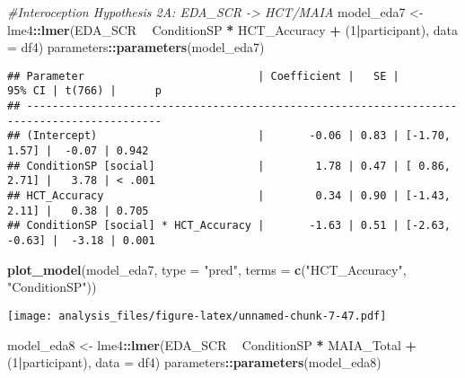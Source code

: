 \documentclass[
]{article}
\newenvironment{Shaded}{\begin{snugshade}}{\end{snugshade}}
\newcommand{\CommentTok}[1]{\textcolor[rgb]{0.56,0.35,0.01}{\textit{#1}}}
\newcommand{\DataTypeTok}[1]{\textcolor[rgb]{0.13,0.29,0.53}{#1}}
\newcommand{\DecValTok}[1]{\textcolor[rgb]{0.00,0.00,0.81}{#1}}
\newcommand{\KeywordTok}[1]{\textcolor[rgb]{0.13,0.29,0.53}{\textbf{#1}}}
\newcommand{\NormalTok}[1]{#1}
\newcommand{\OperatorTok}[1]{\textcolor[rgb]{0.81,0.36,0.00}{\textbf{#1}}}
\newcommand{\StringTok}[1]{\textcolor[rgb]{0.31,0.60,0.02}{#1}}
\begin{document}
\begin{Shaded}
\begin{Highlighting}[]
\CommentTok{#Interoception Hypothesis 2A: EDA_SCR -> HCT/MAIA}
\NormalTok{model_eda7 <-}\StringTok{ }\NormalTok{lme4}\OperatorTok{::}\KeywordTok{lmer}\NormalTok{(EDA_SCR }\OperatorTok{~}\StringTok{ }\NormalTok{ConditionSP }\OperatorTok{*}\StringTok{ }\NormalTok{HCT_Accuracy }\OperatorTok{+}\StringTok{ }\NormalTok{(}\DecValTok{1}\OperatorTok{|}\NormalTok{participant), }\DataTypeTok{data =}\NormalTok{ df4)}
\NormalTok{parameters}\OperatorTok{::}\KeywordTok{parameters}\NormalTok{(model_eda7)}
\end{Highlighting}
\end{Shaded}

\begin{verbatim}
## Parameter                           | Coefficient |   SE |         95% CI | t(766) |      p
## -------------------------------------------------------------------------------------------
## (Intercept)                         |       -0.06 | 0.83 | [-1.70,  1.57] |  -0.07 | 0.942 
## ConditionSP [social]                |        1.78 | 0.47 | [ 0.86,  2.71] |   3.78 | < .001
## HCT_Accuracy                        |        0.34 | 0.90 | [-1.43,  2.11] |   0.38 | 0.705 
## ConditionSP [social] * HCT_Accuracy |       -1.63 | 0.51 | [-2.63, -0.63] |  -3.18 | 0.001
\end{verbatim}

\begin{Shaded}
\begin{Highlighting}[]
\KeywordTok{plot_model}\NormalTok{(model_eda7, }\DataTypeTok{type =} \StringTok{"pred"}\NormalTok{, }\DataTypeTok{terms =} \KeywordTok{c}\NormalTok{(}\StringTok{"HCT_Accuracy"}\NormalTok{, }\StringTok{"ConditionSP"}\NormalTok{))}
\end{Highlighting}
\end{Shaded}

\texttt{[image: analysis\_files/figure-latex/unnamed-chunk-7-47.pdf]}

\begin{Shaded}
\begin{Highlighting}[]
\NormalTok{model_eda8 <-}\StringTok{ }\NormalTok{lme4}\OperatorTok{::}\KeywordTok{lmer}\NormalTok{(EDA_SCR }\OperatorTok{~}\StringTok{ }\NormalTok{ConditionSP }\OperatorTok{*}\StringTok{ }\NormalTok{MAIA_Total }\OperatorTok{+}\StringTok{ }\NormalTok{(}\DecValTok{1}\OperatorTok{|}\NormalTok{participant), }\DataTypeTok{data =}\NormalTok{ df4)}
\NormalTok{parameters}\OperatorTok{::}\KeywordTok{parameters}\NormalTok{(model_eda8)}
\end{Highlighting}
\end{Shaded}
\end{document}
